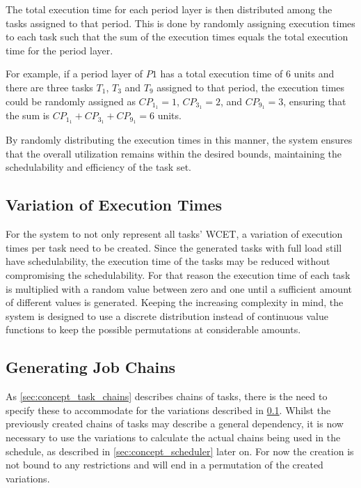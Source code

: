 The total execution time for each period layer is then distributed among the tasks assigned to that period. This is done by randomly assigning execution times to each task such that the sum of the execution times equals the total execution time for the period layer.

For example, if a period layer of $P1$ has a total execution time of $6$ units and there are three tasks $T_1$, $T_3$ and $T_9$ assigned to that period, the execution times could be randomly assigned as $CP_{1_1} = 1$, $CP_{3_1} = 2$, and $CP_{9_1} = 3$, ensuring that the sum is \( CP_{1_1} + CP_{3_1} + CP_{9_1} = 6 \) units.

By randomly distributing the execution times in this manner, the system ensures that the overall utilization remains within the desired bounds, maintaining the schedulability and efficiency of the task set.

\subsection{Variation of Execution Times}\label{sec:concept_lower_execution_times}
For the system to not only represent all tasks' \ac{WCET}, a variation of execution times per task need to be created.
Since the generated tasks with full load still have schedulability, the execution time of the tasks may be reduced without compromising the schedulability.
For that reason the execution time of each task is multiplied with a random value between zero and one until a sufficient amount of different values is generated.
Keeping the increasing complexity in mind, the system is designed to use a discrete distribution instead of continuous value functions to keep the possible permutations at considerable amounts.

\subsection{Generating Job Chains}\label{sec:concept_job_chains}
As \cref{sec:concept_task_chains} describes chains of tasks, there is the need to specify these to accommodate for the variations described in \cref{sec:concept_lower_execution_times}.
Whilst the previously created chains of tasks may describe a general dependency, it is now necessary to use the variations to calculate the actual chains being used in the schedule, as described in \cref{sec:concept_scheduler} later on.
For now the creation is not bound to any restrictions and will end in a permutation of the created variations.

